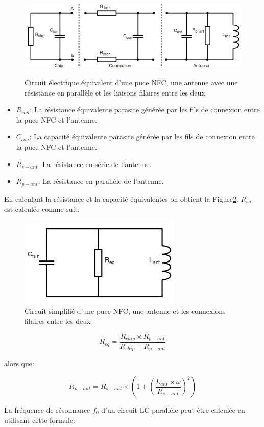 \documentclass{themeensg}
\begin{document}
\begin{figure}[h!]
\includegraphics[scale=0.7]{images/withPARA.png}
\label{fig:completeeq2}
\caption{Circuit électrique équivalent d'une puce NFC, une antenne avec une résistance en parallèle et les liaisons filaires entre les deux}
\end{figure}
\begin{itemize}
\item $R_{con}$: La résistance équivalente parasite générée par les fils de connexion entre la puce NFC et l'antenne.
\item $C_{con}$: La capacité équivalente parasite générée par les fils de connexion entre la puce NFC et l'antenne.
\item $R_{s-ant}$: La résistance en série de l'antenne.
\item $R_{p-ant}$: La résistance en parallèle de l'antenne.
\end{itemize}
En calculant la résistance et la capacité équivalentes on obtient la Figure\ref{fig:circuiteq}. $R_{eq}$ est calculée comme suit:

\begin{figure}
\centering
\label{fig:circuiteq}
\includegraphics[scale=0.6]{images/circuiteq.png}
\caption{Circuit simplifié d'une puce NFC, une antenne et les connexions filaires entre les deux}
\end{figure}

$$R_{eq}=\frac{R_{chip}\times R_{p-ant}}{R_{chip}+R_{p-ant}}$$

alors que:

$$R_{p-ant}=R_{s-ant}\times(1+(\frac{L_{ant}\times\omega}{R_{s-ant}})^2)$$

La fréquence de résonnance $f_0$ d'un circuit LC parallèle peut être calculée en utilisant cette formule:
\end{document}
